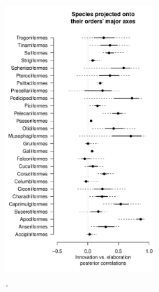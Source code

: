 \documentclass[12pt,letterpaper]{article}
\providecommand{\DIFdelbegin}{} %
\providecommand{\DIFdelend}{} %
\providecommand{\DIFaddbeginFL}{} %
\providecommand{\DIFaddendFL}{} %
\providecommand{\DIFdelbeginFL}{} %
\providecommand{\DIFdelendFL}{} %
\newcommand{\DIFscaledelfig}{0.5}
\newlength{\DIFdelgraphicswidth} %
\newlength{\DIFdelgraphicsheight} %
\newcommand{\DIFaddincludegraphics}[2][]{{\color{blue}\fbox{\DIFOincludegraphics[#1]{#2}}}} %
\newcommand{\DIFdelincludegraphics}[2][]{%
\sbox{\DIFdelgraphicsbox}{\DIFOincludegraphics[#1]{#2}}%
\settoboxwidth{\DIFdelgraphicswidth}{\DIFdelgraphicsbox} %
\settoboxtotalheight{\DIFdelgraphicsheight}{\DIFdelgraphicsbox} %
\scalebox{\DIFscaledelfig}{%
\parbox[b]{\DIFdelgraphicswidth}{\usebox{\DIFdelgraphicsbox}\\[-\baselineskip] \rule{\DIFdelgraphicswidth}{0em}}\llap{\resizebox{\DIFdelgraphicswidth}{\DIFdelgraphicsheight}{%
\setlength{\unitlength}{\DIFdelgraphicswidth}%
\begin{picture}(1,1)%
\thicklines\linethickness{2pt} %
{\color[rgb]{1,0,0}\put(0,0){\framebox(1,1){}}}%
{\color[rgb]{1,0,0}\put(0,0){\line( 1,1){1}}}%
{\color[rgb]{1,0,0}\put(0,1){\line(1,-1){1}}}%
\end{picture}%
}\hspace*{3pt}}} %
} %
\DeclareRobustCommand{\DIFdelbegin}{\DIFOdelbegin \let\includegraphics\DIFdelincludegraphics} %
\DeclareRobustCommand{\DIFdelend}{\DIFOaddend \let\includegraphics\DIFOincludegraphics} %
\DeclareRobustCommand{\DIFaddbeginFL}{\DIFOaddbeginFL \let\includegraphics\DIFaddincludegraphics} %
\DeclareRobustCommand{\DIFaddendFL}{\DIFOaddendFL \let\includegraphics\DIFOincludegraphics} %
\DeclareRobustCommand{\DIFdelbeginFL}{\DIFOdelbeginFL \let\includegraphics\DIFdelincludegraphics} %
\DeclareRobustCommand{\DIFdelendFL}{\DIFOaddendFL \let\includegraphics\DIFOincludegraphics} %
\begin{document}
\begin{figure}[!htbp]
\centering
   \DIFdelbeginFL %
\DIFdelendFL \DIFaddbeginFL \includegraphics[width=0.5\textwidth]{Figures/correlations_fable_orders.pdf}
\DIFaddendFL \caption{.}
\DIFdelbeginFL %
\DIFdelendFL \DIFaddbeginFL \label{fable_correlations}
\DIFaddendFL \end{figure}
\DIFdelbegin %

\DIFdelend \bigskip
\end{document}
